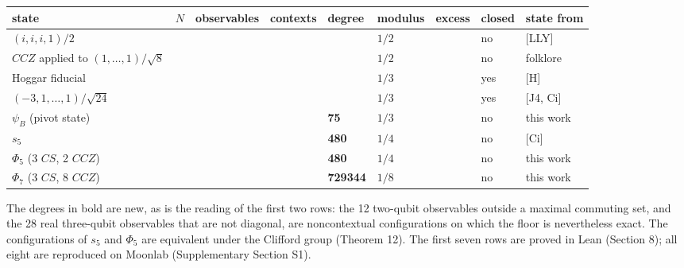\documentclass[11pt,a4paper]{article}
\begin{document}
{\def\LTcaptype{none} %
{\footnotesize
\begin{longtable}[]{@{}>{\raggedright\arraybackslash}p{}>{\raggedright\arraybackslash}p{}>{\raggedright\arraybackslash}p{}>{\raggedright\arraybackslash}p{}>{\raggedright\arraybackslash}p{}>{\raggedright\arraybackslash}p{}>{\raggedright\arraybackslash}p{}>{\raggedright\arraybackslash}p{}>{\raggedright\arraybackslash}p{}@{}}
\toprule\noalign{}
state & \(N\) & observables & contexts & degree & modulus & excess & closed & state from \\
\midrule\noalign{}
\endhead
\bottomrule\noalign{}
\endlastfoot
\((i,i,i,1)/2\) & 2 & 12 & 8 & 0 & \(1/2\) & 2 & no & {[}LLY{]} \\
\(CCZ\) applied to \((1,\dots,1)/\sqrt8\) & 3 & 28 & 56 & 0 & \(1/2\) & 6 & no & folklore \\
Hoggar fiducial & 3 & 63 & 315 & 63 & \(1/3\) & 9 & yes & {[}H{]} \\
\((-3,1,\dots,1)/\sqrt{24}\) & 4 & 135 & 1575 & 315 & \(1/3\) & 21 & yes & {[}J4, Ci{]} \\
\(\psi_B\) (pivot state) & 4 & 135 & 1095 & \textbf{75} & \(1/3\) & 21 & no & this work \\
\(s_5\) & 5 & 496 & 10880 & \textbf{480} & \(1/4\) & 60 & no & {[}Ci{]} \\
\(\Phi_5\) (3 \(CS\), 2 \(CCZ\)) & 5 & 496 & 10880 & \textbf{480} & \(1/4\) & 60 & no & this work \\
\(\Phi_7\) (3 \(CS\), 8 \(CCZ\)) & 7 & 8128 & 2824192 & \textbf{729344} & \(1/8\) & 504 & no & this work \\
\end{longtable}
}
}

The degrees in bold are new, as is the reading of the first two rows: the 12 two-qubit observables
outside a maximal commuting set, and the 28 real three-qubit observables that are not diagonal, are
noncontextual configurations on which the floor is nevertheless exact. The configurations of \(s_5\) and
\(\Phi_5\) are equivalent under the Clifford group (Theorem 12). The first seven rows are proved in Lean
(Section 8); all eight are reproduced on Moonlab (Supplementary Section S1).
\end{document}
